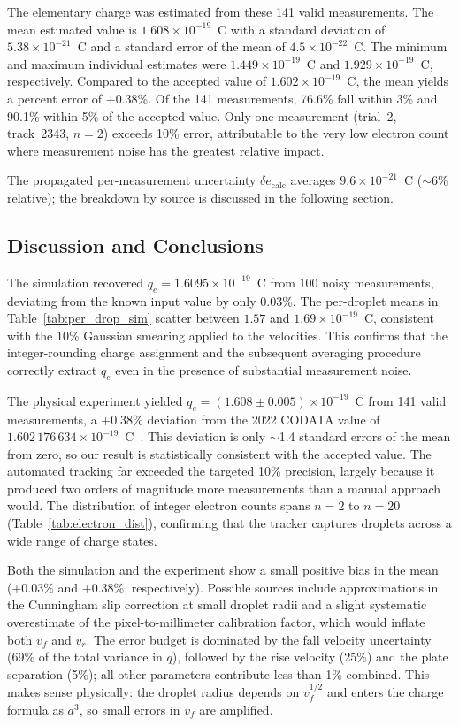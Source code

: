 \documentclass[%
 reprint,
 amsmath,amssymb,
 aps,
]{revtex4-2}
\begin{document}
The elementary charge was estimated from these 141 valid measurements. The mean estimated value is $1.608 \times 10^{-19}$~C with a standard deviation of $5.38 \times 10^{-21}$~C and a standard error of the mean of $4.5 \times 10^{-22}$~C. The minimum and maximum individual estimates were $1.449 \times 10^{-19}$~C and $1.929 \times 10^{-19}$~C, respectively. Compared to the accepted value of $1.602 \times 10^{-19}$~C, the mean yields a percent error of +0.38\%. Of the 141 measurements, 76.6\% fall within 3\% and 90.1\% within 5\% of the accepted value. Only one measurement (trial~2, track~2343, $n = 2$) exceeds 10\% error, attributable to the very low electron count where measurement noise has the greatest relative impact.

The propagated per-measurement uncertainty $\delta e_{\text{calc}}$ averages $9.6 \times 10^{-21}$~C ($\sim$6\% relative); the breakdown by source is discussed in the following section.


\subsection{Discussion and Conclusions}

The simulation recovered \(q_e = 1.6095 \times 10^{-19}\)~C from 100 noisy measurements, deviating from the known input value by only 0.03\%. The per-droplet means in Table~\ref{tab:per_drop_sim} scatter between \(1.57\) and \(1.69 \times 10^{-19}\)~C, consistent with the 10\% Gaussian smearing applied to the velocities. This confirms that the integer-rounding charge assignment and the subsequent averaging procedure correctly extract \(q_e\) even in the presence of substantial measurement noise.

The physical experiment yielded \(q_e = (1.608 \pm 0.005) \times 10^{-19}\)~C from 141 valid measurements, a +0.38\% deviation from the 2022 CODATA value of \(1.602\,176\,634 \times 10^{-19}\)~C~\cite{NIST-e-2022}. This deviation is only $\sim$1.4 standard errors of the mean from zero, so our result is statistically consistent with the accepted value. The automated tracking far exceeded the targeted 10\% precision, largely because it produced two orders of magnitude more measurements than a manual approach would. The distribution of integer electron counts spans $n = 2$ to $n = 20$ (Table~\ref{tab:electron_dist}), confirming that the tracker captures droplets across a wide range of charge states.

Both the simulation and the experiment show a small positive bias in the mean (+0.03\% and +0.38\%, respectively). Possible sources include approximations in the Cunningham slip correction at small droplet radii and a slight systematic overestimate of the pixel-to-millimeter calibration factor, which would inflate both \(v_f\) and \(v_r\). The error budget is dominated by the fall velocity uncertainty (69\% of the total variance in $q$), followed by the rise velocity (25\%) and the plate separation (5\%); all other parameters contribute less than 1\% combined. This makes sense physically: the droplet radius depends on $v_f^{1/2}$ and enters the charge formula as $a^3$, so small errors in $v_f$ are amplified.
\end{document}
